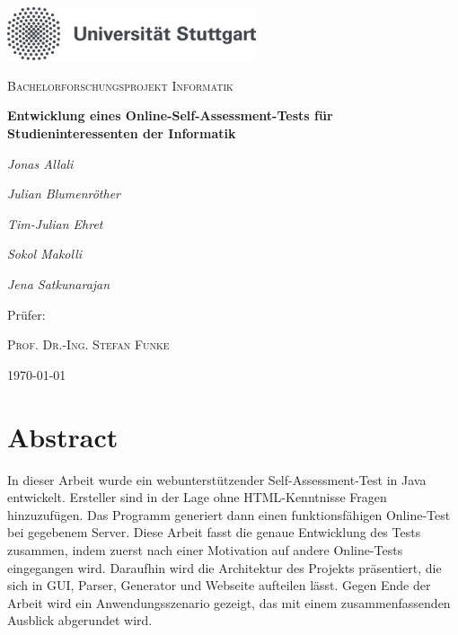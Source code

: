 \documentclass[a4paper,12pt,headsepline,twocolumn]{scrartcl}
\begin{document}
	
\newpage
\thispagestyle{empty} %
\section*{ }


\begin{titlepage}
		
		\centering
		\includegraphics[width=0.55\textwidth]{unistuttgart_logo_deutsch}\par\vspace{1cm}
		{\scshape\Large Bachelorforschungsprojekt Informatik\par}
		\vspace{1.5cm}
		{\huge\bfseries Entwicklung eines
			Online-Self-Assessment-Tests für
			Studieninteressenten der Informatik\par}
		\vspace{2cm}
		{\Large\itshape Jonas Allali\par}
		\vspace{0.2cm}
		{\Large\itshape Julian Blumenröther\par}
		\vspace{0.2cm}
		{\Large\itshape Tim-Julian Ehret\par}
		\vspace{0.2cm}
		{\Large\itshape Sokol Makolli\par}
		\vspace{0.2cm}
		{\Large\itshape Jena Satkunarajan\par}
		\vspace{1cm}
		{\Large Prüfer: \par
			\vspace{0.3cm}
		\textsc{Prof. Dr.-Ing. Stefan Funke}}
		
		\vfill
		
		{\large \today\par}
\end{titlepage}	
\tableofcontents
\clearpage
\section{Abstract}
In dieser Arbeit wurde ein webunterstützender Self-Assessment-Test in Java entwickelt. Ersteller sind in der Lage ohne HTML-Kenntnisse Fragen hinzuzufügen. Das Programm generiert dann einen funktionsfähigen Online-Test bei gegebenem Server. Diese Arbeit fasst die genaue Entwicklung des Tests zusammen, indem zuerst nach einer Motivation auf andere Online-Tests eingegangen wird. Daraufhin wird die Architektur des Projekts präsentiert, die sich in GUI, Parser, Generator und Webseite aufteilen lässt. Gegen Ende der Arbeit wird ein Anwendungsszenario gezeigt, das mit einem zusammenfassenden Ausblick abgerundet wird.
\end{document}
